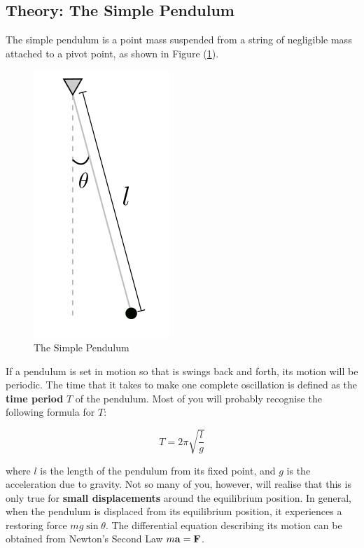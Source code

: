 \subsection{Theory: The Simple Pendulum}

The simple pendulum is a point mass suspended from a string of negligible mass attached to a pivot point, as shown in Figure (\ref{simple}). 

\begin{figure}[!htb]
    \centering
    \includegraphics[scale=0.5]{figs/simplependulum.png}
    \caption{The Simple Pendulum}
    \label{simple}
\end{figure}

If a pendulum is set in motion so that is swings back and forth, its motion will be periodic. The time that it takes to make one complete oscillation is defined as the \textbf{time period} $T$ of the pendulum. Most of you will probably recognise the following formula for $T$: 

\begin{equation}
    T = 2 \pi \sqrt{\frac{l}{g}} 
    \label{TimeP}
\end{equation}

where $l$ is the length of the pendulum from its fixed point, and $g$ is the acceleration due to gravity. Not so many of you, however, will realise that this is only true for \textbf{small displacements} around the equilibrium position. In general, when the pendulum is displaced from its equilibrium position, it experiences a restoring force $m g \sin\theta$. The differential equation describing its motion can be obtained from Newton's Second Law  $m\vb{a} = \vb{F}$.

